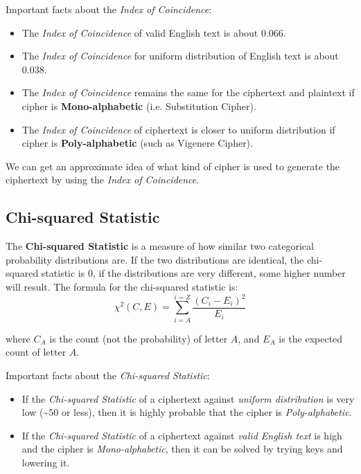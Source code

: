\documentclass[10pt,twoside]{article}
\begin{document}
Important facts about the \textit{Index of Coincidence}:
\begin{itemize}
  \setlength\itemsep{0em}
    \item The \textit{Index of Coincidence} of valid English text is about $0.066$.
    \item The \textit{Index of Coincidence} for uniform distribution of English text is about $0.038$.
    \item The \textit{Index of Coincidence} remains the same for the ciphertext and plaintext if cipher is \textbf{Mono-alphabetic} (i.e. Substitution Cipher).
    \item The \textit{Index of Coincidence} of ciphertext is closer to uniform distribution if cipher is \textbf{Poly-alphabetic} (such as Vigenere Cipher).
\end{itemize}

We can get an approximate idea of what kind of cipher is used to generate the ciphertext by using the \textit{Index of Coincidence}.

\subsection{Chi-squared Statistic} \label{chi}
The \textbf{Chi-squared Statistic} is a measure of how similar two categorical probability distributions are. If the two distributions are identical, the chi-squared statistic is 0, if the distributions are very different, some higher number will result. The formula for the chi-squared statistic is:
$$\chi^2(C,E) = \sum_{i=A}^{i=Z}\frac{(C_i-E_i)^2}{E_i}$$

where $C_A$ is the count (not the probability) of letter $A$, and $E_A$ is the expected count of letter $A$. \newline

Important facts about the \textit{Chi-squared Statistic}:
\begin{itemize}
  \setlength\itemsep{0em}
  \item If the \textit{Chi-squared Statistic} of a ciphertext against \textit{uniform distribution} is very low (\textasciitilde 50 or less), then it is highly probable that the cipher is \textit{Poly-alphabetic}.
  \item If the \textit{Chi-squared Statistic} of a ciphertext against \textit{valid English text} is high and the cipher is \textit{Mono-alphabetic}, then it can be solved by trying keys and lowering it.
\end{itemize}
\end{document}
